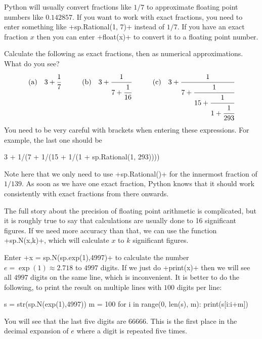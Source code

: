 \documentclass[a4paper,10pt]{amsbook}
\begin{document}
Python will usually convert fractions like $1/7$ to approximate
floating point numbers like $0.142857$.  If you want to work with
exact fractions, you need to enter something like
\pcode+sp.Rational(1, 7)+ instead of $1/7$.  If you have an exact
fraction $x$ then you can enter \pcode+float(x)+ to convert it to a
floating point number.

\begin{exercise}\label{ex-cfrac-pi}
 Calculate the following as exact fractions, then as numerical
 approximations.  What do you see? 
 \[ \text{(a)}\hspace{1em}
     3+\cfrac{1}{7}
    \hspace{3em}
    \text{(b)}\hspace{1em}
     3+\cfrac{1}{7 + \cfrac{1}{16}}
    \hspace{3em}
    \text{(c)}\hspace{1em}
     3+\cfrac{1}{7 + \cfrac{1}{15 + \cfrac{1}{1 + \cfrac{1}{293}}}}  
  \]
  You need to be very careful with brackets when entering these
  expressions.  For example, the last one should be
\begin{pcodeblock}
  3 + 1/(7 + 1/(15 + 1/(1 + sp.Rational(1, 293))))
\end{pcodeblock}
 Note here that we only need to use \pcode+sp.Rational()+ for the
 innermost fraction of $1/139$.  As soon as we have one exact
 fraction, Python knows that it should work consistently with exact
 fractions from there onwards.
\end{exercise}

The full story about the precision of floating point arithmetic is
complicated, but it is roughly true to say that calculations are
usually done to 16 significant figures.  If we need more accuracy than
that, we can use the function \pcode+sp.N(x,k)+, which will calculate
$x$ to $k$ significant figures.

\begin{exercise}\label{ex-e-digits}
 Enter \pcode+x = sp.N(sp.exp(1),4997)+ to calculate the number
 $e=\exp(1)\approx 2.718$ to $4997$ digits.  If we just do
 \pcode+print(x)+ then we will see all $4997$ digits on the same line,
 which is inconvenient.  It is better to do the following, to print
 the result on multiple lines with $100$ digits per line:
 \begin{pcodeblock}
  s = str(sp.N(exp(1),4997))
  m = 100
  for i in range(0, len(s), m):
      print(s[i:i+m])
 \end{pcodeblock}
 You will see that the last five digits are $66666$.  This is the
 first place in the decimal expansion of $e$ where a digit is repeated
 five times.
\end{exercise}
\end{document}
